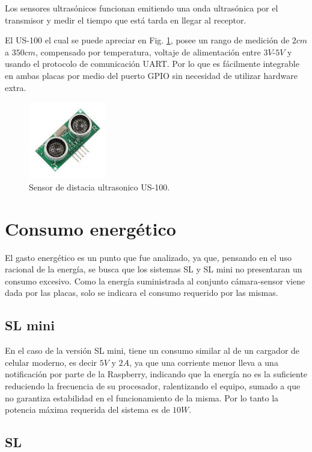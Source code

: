 Los sensores ultrasónicos funcionan emitiendo una onda ultrasónica por el transmisor y medir el tiempo que está tarda en llegar al receptor.

El US-100 el cual se puede apreciar en Fig. \ref{fig:sensor-US100}, posee un rango de medición de $2cm$ a $350cm$, compensado por temperatura, voltaje de alimentación entre $3V$-$5V$ y usando el protocolo de
comunicación UART.
Por lo que es fácilmente integrable en ambas placas por medio del puerto GPIO sin necesidad de utilizar hardware extra.
\begin{figure}
    \centering
    \includegraphics[width=0.3\textwidth]{imgs/us-100.jpg}
    \caption{Sensor de distacia ultrasonico US-100.}
    \label{fig:sensor-US100}
\end{figure}

\section{Consumo energético}

El gasto energético es un punto que fue analizado, ya que, pensando en el uso racional de la energía, se busca que los sistemas SL y SL mini no presentaran un consumo excesivo.
Como la energía suministrada al conjunto cámara-sensor viene dada por las placas, solo se indicara el consumo requerido por las mismas.


\subsection{SL mini}

En el caso de la versión SL mini, tiene un consumo similar al de un cargador de celular moderno, es decir $5V$ y
$2A$, ya que una corriente menor lleva a una notificación por parte de la Raspberry, indicando que la energía no es la
suficiente reduciendo la frecuencia de su procesador, ralentizando el equipo, sumado a que no garantiza estabilidad en el funcionamiento de la misma. Por lo tanto la potencia máxima requerida del sistema es de $10W$.

\subsection{SL}

